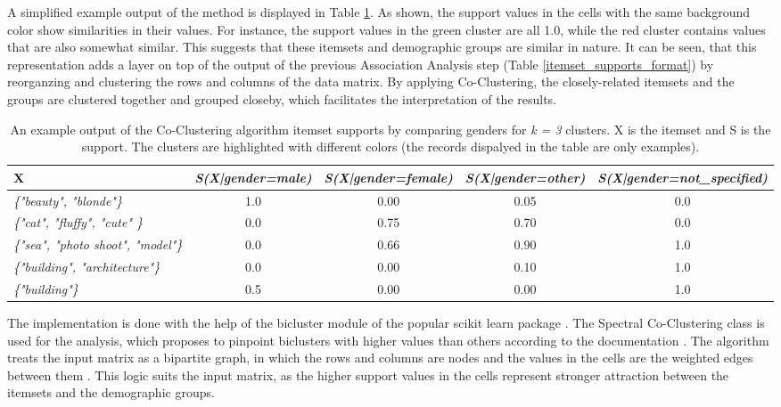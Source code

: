     A simplified example output of the method is displayed in Table \ref{coclustering_output_format}. As shown, the support values in the cells with the same background color show similarities in their values. For instance, the support values in the green cluster are all 1.0, while the red cluster contains values that are also somewhat similar. This suggests that these itemsets and demographic groups are similar in nature. It can be seen, that this representation adds a layer on top of the output of the previous Association Analysis step (Table \ref{itemset_supports_format}) by reorganzing and clustering the rows and columns of the data matrix. By applying Co-Clustering, the closely-related itemsets and the groups are clustered together and grouped closeby, which facilitates the interpretation of the results. 

    \begin{table}[]
        \centering
        \begin{adjustbox}{width=1\textwidth}
            \begin{tabular}{l|c|c|c|c}
                X & \emph{S(X|gender=male)} & \emph{S(X|gender=female)} & \emph{S(X|gender=other)} & \emph{S(X|gender=not\_specified)} \\
                \hline
                \emph{\{"beauty", "blonde"\}} & \cellcolor{blue!25}1.0 &  0.00 &  0.05 &  0.0 \\
                \emph{\{"cat", "fluffy", "cute" \}} &  0.0 & \cellcolor{red!25}0.75 & \cellcolor{red!25}0.70 &  0.0 \\
                \emph{\{"sea", "photo shoot", "model"\}} &  0.0 & \cellcolor{red!25}0.66 & \cellcolor{red!25}0.90 & \cellcolor{green!25}1.0 \\
                \emph{\{"building", "architecture"\}} &  0.0 &  0.00 &  0.10 & \cellcolor{green!25}1.0 \\
                \emph{\{"building"\}} &  0.5 &  0.00 &  0.00 & \cellcolor{green!25}1.0
            \end{tabular}
        \end{adjustbox}
        \caption{An example output of the Co-Clustering algorithm itemset supports by comparing genders for \emph{k = 3} clusters. X is the itemset and S is the support. The clusters are highlighted with different colors (the records dispalyed in the table are only examples).}
        \label{coclustering_output_format}
    \end{table}
    
    The implementation is done with the help of the bicluster module \cite{scikit-bicluster} of the popular scikit learn package \cite{scikit-learn}. The Spectral Co-Clustering class is used for the analysis, which proposes to pinpoint biclusters with higher values than others according to the documentation \cite{scikit-bicluster}. The algorithm treats the input matrix as a bipartite graph, in which the rows and columns are nodes and the values in the cells are the weighted edges between them \cite{scikit-bicluster}. This logic suits the input matrix, as the higher support values in the cells represent stronger attraction between the itemsets and the demographic groups.

